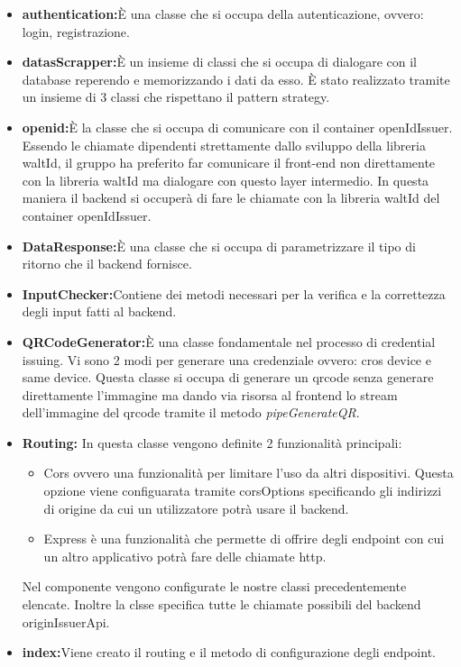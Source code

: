 \begin{itemize}
    \item \textbf{authentication:}È una classe che si occupa della autenticazione, ovvero: login, registrazione. 
    \item \textbf{datasScrapper:}È un insieme di classi che si occupa di dialogare con il database reperendo e memorizzando i dati da esso. È stato realizzato tramite un insieme di 3 classi che rispettano il pattern strategy. 
    \item \textbf{openid:}È la classe che si occupa di comunicare con il container openIdIssuer. Essendo le chiamate dipendenti strettamente dallo sviluppo della libreria waltId, il gruppo ha preferito far comunicare il front-end non direttamente con la libreria waltId ma dialogare con questo layer intermedio. In questa maniera il backend si occuperà di fare le chiamate con la libreria waltId del container openIdIssuer.
    \item \textbf{DataResponse:}È una classe che si occupa di parametrizzare il tipo di ritorno che il backend fornisce.
    \item \textbf{InputChecker:}Contiene dei metodi necessari per la verifica e la correttezza degli input fatti al backend.
    \item \textbf{QRCodeGenerator:}È una classe fondamentale nel processo di credential issuing. Vi sono 2 modi per generare una credenziale ovvero: cros device e same device. Questa classe si occupa di generare un qrcode senza generare direttamente l'immagine ma dando via risorsa al frontend lo stream dell'immagine del qrcode tramite il metodo \textit{pipeGenerateQR}.
    \item \textbf{Routing:} In questa classe vengono definite 2 funzionalità principali:
     \begin{itemize}
     \item Cors ovvero una funzionalità per limitare l'uso da altri dispositivi. Questa opzione viene configuarata tramite corsOptions specificando gli indirizzi di origine da cui un utilizzatore potrà usare il backend. 
     \item Express è una funzionalità che permette di offrire degli endpoint con cui un altro applicativo potrà fare delle chiamate http. 
     \end{itemize}
    Nel componente vengono configurate le nostre classi precedentemente elencate.
    Inoltre la clsse specifica tutte le chiamate possibili del backend originIssuerApi.
    \item \textbf{index:}Viene creato il routing e il metodo di configurazione degli endpoint.
\end{itemize}


